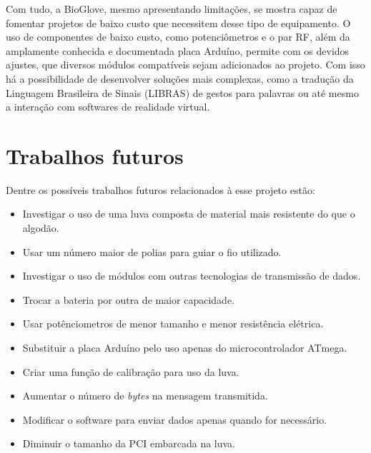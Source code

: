 \documentclass[
	12pt,				%
	openright,			%
	oneside,			%
	a4paper,			%
	english,			%
	brazil				%
	]{abntex2}
\begin{document}
		Com tudo, a BioGlove, mesmo apresentando limitações, se mostra capaz de fomentar projetos de baixo custo que necessitem desse tipo de equipamento. O uso de componentes de baixo custo, como potenciômetros e o par RF, além da amplamente conhecida e documentada placa Arduíno, permite com os devidos ajustes, que diversos módulos compatíveis sejam adicionados ao projeto. Com isso há a possibilidade de desenvolver soluções mais complexas, como a tradução da Linguagem Brasileira de Sinais (LIBRAS) de gestos para palavras ou até mesmo a interação com softwares de realidade virtual.

			\section{Trabalhos futuros}		

		Dentre os possíveis trabalhos futuros relacionados à esse projeto estão:

		\begin{itemize}
			\item Investigar o uso de uma luva composta de material mais resistente do que o algodão.
			\item Usar um número maior de polias para guiar o fio utilizado.
			\item Investigar o uso de módulos com outras tecnologias de transmissão de dados.
			\item Trocar a bateria por outra de maior capacidade.
			\item Usar potênciometros de menor tamanho e menor resistência elétrica.
			\item Substituir a placa Arduíno pelo uso apenas do microcontrolador ATmega.
			\item Criar uma função de calibração para uso da luva.
			\item Aumentar o número de \textit{bytes} na mensagem transmitida.
			\item Modificar o software para enviar dados apenas quando for necessário.
			\item Diminuir o tamanho da PCI embarcada na luva.
		\end{itemize}
\end{document}
